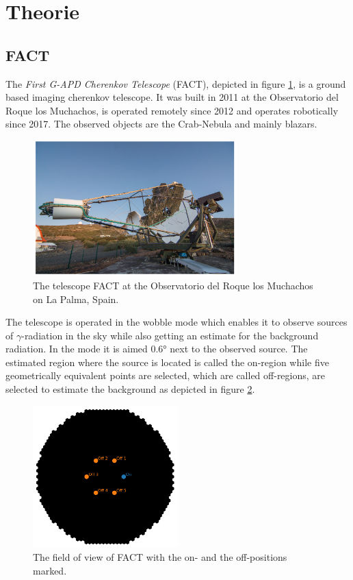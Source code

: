 \section{Theorie}
\label{sec:Theorie}

\subsection{FACT}

The \textit{First G-APD Cherenkov Telescope} (FACT), depicted in figure \ref{fig:FACT}, is a ground based imaging cherenkov telescope. It was built in 2011 at the Observatorio 
del Roque los Muchachos, is operated remotely since 2012 and operates robotically since 2017.
The observed objects are the Crab-Nebula and mainly blazars. 
%
\begin{figure}[H]
    \centering
    \includegraphics[width=0.7\textwidth]{graphics/FACT.png}
    \caption{The telescope FACT at the Observatorio del Roque los Muchachos on La Palma, Spain. \cite{sample}}
    \label{fig:FACT}
  \end{figure}
The telescope is operated in the wobble mode which enables it to observe sources of $\gamma$-radiation in the sky while also getting an estimate for the 
background radiation. In the mode it is aimed $0.6 °$ next to the observed source. The estimated region where the source is located is called the on-region 
while five geometrically equivalent points are selected, which are called off-regions, are selected to estimate the background as depicted in figure 
\ref{fig:OnOff}. 

\begin{figure}[H]
    \centering
    \includegraphics[width=0.5\textwidth]{graphics/OnOff.png}
    \caption{The field of view of FACT with the on- and the off-positions marked. \cite{sample}}
    \label{fig:OnOff}
\end{figure}

